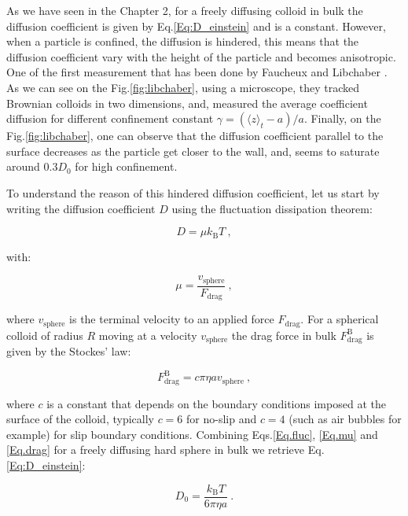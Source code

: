 As we have seen in the Chapter 2, for a freely diffusing colloid in bulk the diffusion coefficient is given by Eq.\ref{Eq:D_einstein} and is a constant. However, when a particle is confined, the diffusion is hindered, this means that the diffusion coefficient vary with the height of the particle and becomes anisotropic. One of the first measurement that has been done by Faucheux and Libchaber \cite{faucheux_confined_1994}. As we can see on the Fig.\ref{fig:libchaber}, using a microscope, they tracked Brownian colloids in two dimensions, and, measured the average coefficient diffusion for different confinement constant $\gamma = (\langle z\rangle_t - a) / a$. Finally, on the Fig.\ref{fig:libchaber}, one can observe that the diffusion coefficient parallel to the surface decreases as the particle get closer to the wall, and, seems to saturate around $0.3D_0$ for high confinement. 
\newpage

To understand the reason of this hindered diffusion coefficient, let us start by writing the diffusion coefficient $D$ using the fluctuation dissipation theorem:

\begin{equation}
	D = \mu k_\mathrm{B}T ~,
	\label{Eq.fluc}
\end{equation}

with:

\begin{equation}
	\mu = \frac{v_\mathrm{sphere}}{F_\mathrm{drag}} ~,
	\label{Eq.mu}
\end{equation}

where $v_\mathrm{sphere}$ is the terminal velocity to an applied force $F_\mathrm{drag}$. For a spherical colloid of radius $R$ moving at a velocity $v_\mathrm{sphere}$ the drag force in bulk $F_{\mathrm{drag}} ^\mathrm{B}$ is given by the Stockes' law:

\begin{equation}
	F_\mathrm{drag} ^\mathrm{B} = c \pi \eta a v_\mathrm{sphere} ~,
	\label{Eq.drag}
\end{equation}

where $c$ is a constant that depends on the boundary conditions imposed at the surface of the colloid, typically $c = 6$ for no-slip  and $c = 4$ (such as air bubbles for example) for slip boundary conditions. Combining Eqs.\ref{Eq.fluc}, \ref{Eq.mu} and \ref{Eq.drag} for a freely diffusing hard sphere in bulk we retrieve Eq.\ref{Eq:D_einstein}: 

\begin{equation}
	D_0 = \frac{k_\mathrm{B}T}{6\pi \eta a} ~.
	\label{Eq.D}
\end{equation}

